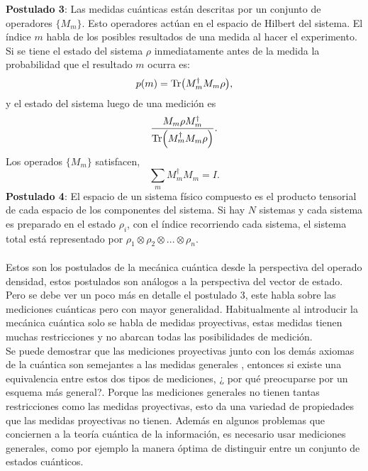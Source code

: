 \textbf{Postulado 3}: Las medidas cuánticas están descritas por un conjunto de operadores $ \{  M_{m} \}$. Esto operadores actúan en el espacio de Hilbert del sistema. El índice $m$ habla de los posibles resultados de una medida al hacer el experimento. Si se tiene el estado del sistema $\rho$ inmediatamente antes de la medida la probabilidad que el resultado $m$ ocurra es:
\begin{equation}
p(m)= \Tr (M^{\dagger}_{m}M_{m} \rho),
\end{equation}
y el estado del sistema luego de una medición es
\begin{equation}
\frac{M_{m} \rho M_{m}^{\dagger}}{\Tr(M^{\dagger}_{m}M_{m} \rho)}.
\end{equation}
Los operados $\{  M_{m} \}$ satisfacen,
\begin{equation}
\sum_{m} M^{\dagger}_{m}M_{m} = I.
\end{equation}
\textbf{Postulado 4}: El espacio de un sistema físico compuesto es el producto tensorial de cada espacio de los componentes del sistema. Si  hay $N$ sistemas y cada sistema es preparado en el estado $\rho_{i}$, con el índice recorriendo cada sistema, el sistema total está representado por $\rho_{1} \otimes \rho_{2} \otimes ...\otimes \rho_{n}$.
\\
\\
Estos son los postulados de la mecánica cuántica desde la perspectiva del operado densidad, estos postulados son análogos a la perspectiva del vector de estado. Pero se debe ver un poco más en detalle el postulado 3, este habla sobre las mediciones cuánticas pero con mayor generalidad. Habitualmente al introducir la mecánica cuántica solo se habla de medidas proyectivas, estas medidas tienen muchas restricciones y no abarcan todas las posibilidades de medición.
\\	
Se puede demostrar que las mediciones proyectivas junto con los demás axiomas de la cuántica son semejantes a las medidas generales \cite{NielsenInformation}, entonces si existe una equivalencia entre estos dos tipos de mediciones, ¿  por qué preocuparse por un esquema más general?. Porque las mediciones generales no tienen tantas restricciones como las medidas proyectivas, esto da una variedad de propiedades que las medidas proyectivas no tienen. Además en algunos problemas que conciernen a la teoría cuántica de la información, es necesario usar mediciones generales, como por ejemplo la manera óptima de distinguir entre un conjunto de estados cuánticos.
\\
